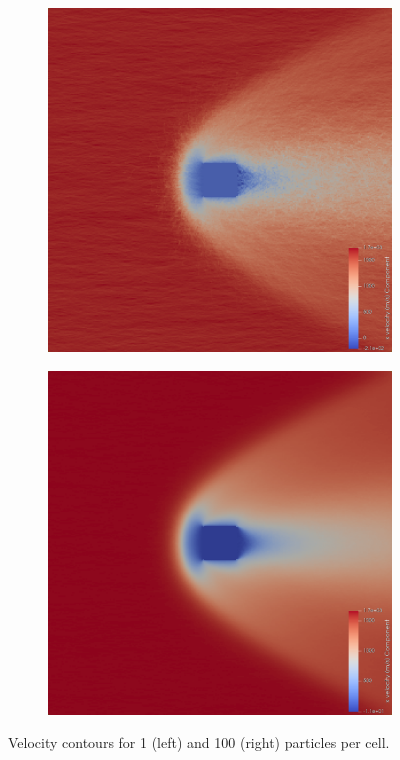 \begin{figure}[H]
    \centering
    \begin{subfigure}{0.49\textwidth}
        \centering
        \includegraphics[width=\textwidth]{Images/3. Methodology/Fnum convergence/1.png}
    \end{subfigure}
    \hfill
    \begin{subfigure}{0.49\textwidth}
        \centering
        \includegraphics[width=\textwidth]{Images/3. Methodology/Fnum convergence/100.png}
    \end{subfigure}
    \caption{Velocity contours for 1 (left) and 100 (right) particles per cell.} 
    \label{fig:fnum}
\end{figure}


